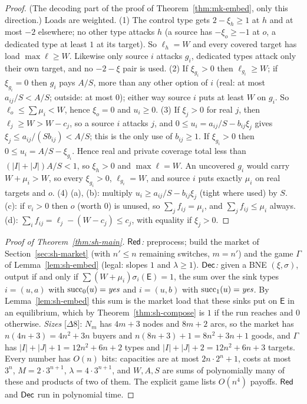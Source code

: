 \begin{proof}
(The decoding part of the proof of Theorem~\ref{thm:mk-embed}, only this direction.) Loads are weighted.
(1) The control type gets $2-\xi_h\ge1$ at $h$ and at most $-2$ elsewhere; no other type attacks $h$ (a
source has $-\xi_o\ge-1$ at $o$, a dedicated type at least $1$ at its target). So $\ell_h=W$ and every
covered target has load $\max\ell\ge W$. Likewise only source $i$ attacks $g_i$, dedicated types attack
only their own target, and no $-2-\xi$ pair is used. (2) If $\xi_{g_i}>0$ then $\ell_{g_i}\ge W$; if
$\xi_{g_i}=0$ then $g_i$ pays $A/S$, more than any other option of $i$ (real: at most $a_{ij}/S<A/S$;
outside: at most $0$); either way source $i$ puts at least $W$ on $g_i$. So $\ell_o\le\sum\mu_i<W$, hence
$\xi_o=0$ and $u_i\ge0$. (3) If $\xi_j>0$ for real $j$, then $\ell_j\ge W>W-c_j$, so a source $i$ attacks
$j$, and $0\le u_i=a_{ij}/S-b_{ij}\xi_j$ gives $\xi_j\le a_{ij}/(Sb_{ij})<A/S$; this is the only use of
$b_{ij}\ge1$. If $\xi_{g_i}>0$ then $0\le u_i=A/S-\xi_{g_i}$. Hence real and private coverage total less
than $(|I|+|J|)A/S<1$, so $\xi_h>0$ and $\max\ell=W$. An uncovered $g_i$ would carry $W+\mu_i>W$, so every
$\xi_{g_i}>0$, $\ell_{g_i}=W$, and source $i$ puts exactly $\mu_i$ on real targets and $o$. (4) (a), (b):
multiply $u_i\ge a_{ij}/S-b_{ij}\xi_j$ (tight where used) by $S$. (c): if $v_i>0$ then $o$ (worth $0$)
is unused, so $\sum_jf_{ij}=\mu_i$, and $\sum_jf_{ij}\le\mu_i$ always. (d): $\sum_if_{ij}=\ell_j-(W-c_j)\le
c_j$, with equality if $\xi_j>0$.
\end{proof}

\begin{proof}[Proof of Theorem~\ref{thm:sh-main}]
\emph{$\mathsf{Red}$:} preprocess; build the market of Section~\ref{sec:sh-market} (with $n'\le n$ remaining
switches, $m=n'$) and the game $\Gamma$ of Lemma~\ref{lem:sh-embed} (legal: slopes $1$ and
$\lambda\ge1$). \emph{$\mathsf{Dec}$:} given a BNE $(\xi,\sigma)$, output \yes{} if and only if
$\sum(W+\mu_i)\sigma_i(\mathsf E)=1$, the sum over the sink types $i=(u,a)$ with $\mathrm{succ}_0(u)=\textit{yes}$ and
$i=(u,b)$ with $\mathrm{succ}_1(u)=\textit{yes}$. By Lemma~\ref{lem:sh-embed} this sum is the market load that these
sinks put on $\mathsf E$ in an equilibrium, which by Theorem~\ref{thm:sh-compose} is $1$ if the run
reaches \yes{} and $0$ otherwise. \emph{Sizes} [$\Delta8$]: $N_m$ has $4m+3$ nodes and $8m+2$ arcs, so
the market has $n(4n+3)=4n^2+3n$ buyers and $n(8n+3)+1=8n^2+3n+1$ goods, and $\Gamma$ has
$|I|+|J|+1=12n^2+6n+2$ types and $|I|+|J|+2=12n^2+6n+3$ targets. Every number has $O(n)$ bits:
capacities are at most $2n\cdot2^n+1$, costs at most $3^n$, $M=2\cdot3^{n+1}$, $\lambda=4\cdot3^{n+1}$,
and $W,A,S$ are sums of polynomially many of these and products of two of them. The explicit game lists $O(n^4)$
payoffs. $\mathsf{Red}$ and $\mathsf{Dec}$ run in polynomial time.
\end{proof}

